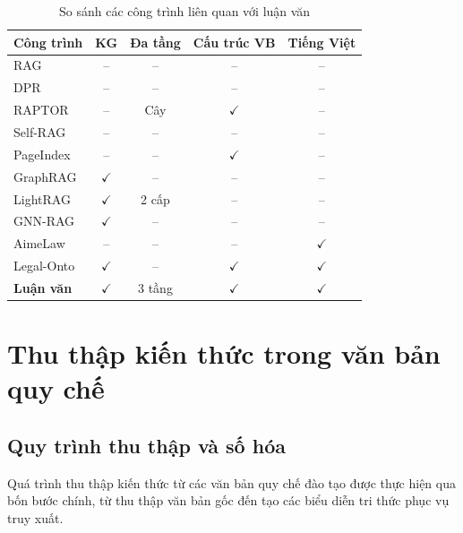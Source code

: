 \begin{table}[htbp]
    \centering
    \caption{So sánh các công trình liên quan với luận văn}
    \label{tab:related-work-compare}
    \small
    \begin{tabular}{p{2.8cm}cccc}
        \toprule
        \textbf{Công trình} & \textbf{KG} & \textbf{Đa tầng} &
        \textbf{Cấu trúc VB} & \textbf{Tiếng Việt} \\
        \midrule
        RAG \cite{lewis2020rag} & -- & -- & -- & -- \\
        DPR \cite{karpukhin2020dpr} & -- & -- & -- & -- \\
        RAPTOR \cite{sarthi2024raptor} & -- & Cây & $\checkmark$ & -- \\
        Self-RAG \cite{asai2024selfrag} & -- & -- & -- & -- \\
        PageIndex \cite{zhang2025pageindex} & -- & -- & $\checkmark$ & -- \\
        GraphRAG \cite{edge2024graphrag} & $\checkmark$ & -- & -- & -- \\
        LightRAG \cite{guo2025lightrag} & $\checkmark$ & 2 cấp & -- & -- \\
        GNN-RAG \cite{mavromatis2024gnnrag} & $\checkmark$ & -- & -- & -- \\
        AimeLaw \cite{ngo2021aimelaw} & -- & -- & -- & $\checkmark$ \\
        Legal-Onto \cite{nguyen2022legalonto} & $\checkmark$ & -- & $\checkmark$ & $\checkmark$ \\
        \textbf{Luận văn} & $\checkmark$ & 3 tầng & $\checkmark$ & $\checkmark$ \\
        \bottomrule
    \end{tabular}
\end{table}

\section{Thu thập kiến thức trong văn bản quy chế}
\label{sec:thuthap_kienthuc}

\subsection{Quy trình thu thập và số hóa}
\label{subsec:quytrinh_thuthap}

Quá trình thu thập kiến thức từ các văn bản quy chế đào tạo được thực hiện qua bốn
bước chính, từ thu thập văn bản gốc đến tạo các biểu diễn tri thức phục vụ truy
xuất.

